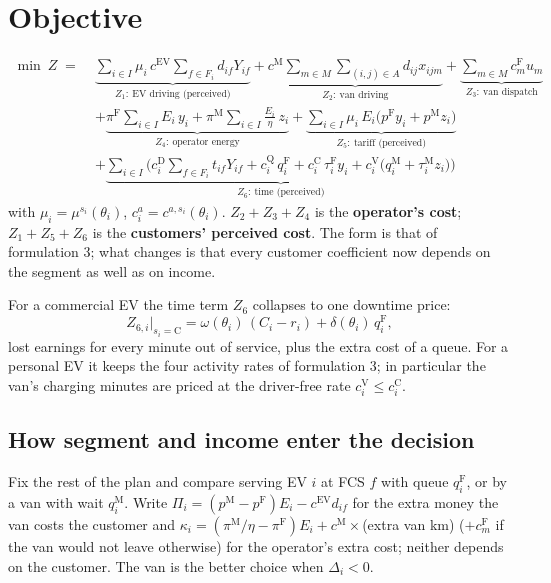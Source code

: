\documentclass[12pt,a4paper]{article}
\begin{document}
\section{Objective}

\begin{equation}
\begin{aligned}
\min\ Z \;=\;& \underbrace{\sum_{i\in I}\mu_i\,c^{\mathrm{EV}}\sum_{f\in F_i}d_{if}Y_{if}}_{Z_1:\ \text{EV driving (perceived)}}
+\underbrace{c^{\mathrm M}\sum_{m\in M}\sum_{(i,j)\in A}d_{ij}x_{ijm}}_{Z_2:\ \text{van driving}}
+\underbrace{\sum_{m\in M}c^{\mathrm F}_mu_m}_{Z_3:\ \text{van dispatch}}\\
&+\underbrace{\pi^{\mathrm F}\sum_{i\in I}E_i\,y_i+\pi^{\mathrm M}\sum_{i\in I}\frac{E_i}{\eta}\,z_i}_{Z_4:\ \text{operator energy}}
+\underbrace{\sum_{i\in I}\mu_i\,E_i\big(p^{\mathrm F}y_i+p^{\mathrm M}z_i\big)}_{Z_5:\ \text{tariff (perceived)}}\\
&+\underbrace{\sum_{i\in I}\Big(c^{\mathrm D}_i\sum_{f\in F_i}t_{if}Y_{if}+c^{\mathrm Q}_i\,q^{\mathrm F}_i+c^{\mathrm C}_i\,\tau^{\mathrm F}_iy_i+c^{\mathrm V}_i\big(q^{\mathrm M}_i+\tau^{\mathrm M}_iz_i\big)\Big)}_{Z_6:\ \text{time (perceived)}}
\end{aligned}\label{eq:obj}
\end{equation}
with $\mu_i=\mu^{s_i}(\theta_i)$, $c^{a}_i=c^{a,s_i}(\theta_i)$. $Z_2+Z_3+Z_4$ is the \textbf{operator's cost}; $Z_1+Z_5+Z_6$ is the \textbf{customers' perceived cost}. The form is that of formulation 3; what changes is that every customer coefficient now depends on the segment as well as on income.

For a commercial EV the time term $Z_6$ collapses to one downtime price:
\[
Z_{6,i}\big|_{s_i=\mathrm C}=\omega(\theta_i)\,(C_i-r_i)+\delta(\theta_i)\,q^{\mathrm F}_i ,
\]
lost earnings for every minute out of service, plus the extra cost of a queue. For a personal EV it keeps the four activity rates of formulation 3; in particular the van's charging minutes are priced at the driver-free rate $c^{\mathrm V}_i\le c^{\mathrm C}_i$.

\subsection{How segment and income enter the decision}
\label{sec:theory}

Fix the rest of the plan and compare serving EV $i$ at FCS $f$ with queue $q^{\mathrm F}_i$, or by a van with wait $q^{\mathrm M}_i$. Write $\Pi_i=(p^{\mathrm M}-p^{\mathrm F})E_i-c^{\mathrm{EV}}d_{if}$ for the extra money the van costs the customer and $\kappa_i=(\pi^{\mathrm M}/\eta-\pi^{\mathrm F})E_i+c^{\mathrm M}\times$(extra van km) ($+c^{\mathrm F}_m$ if the van would not leave otherwise) for the operator's extra cost; neither depends on the customer. The van is the better choice when $\Delta_i<0$.
\end{document}
